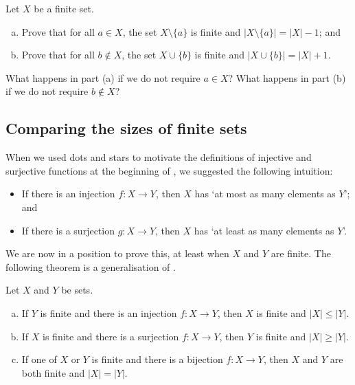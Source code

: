 \begin{exercise}
\label{exAddRemoveElementsOfFiniteSets}
Let $X$ be a finite set.
\begin{enumerate}[(a)]
\item Prove that for all $a \in X$, the set $X \setminus \{ a \}$ is finite and $|X \setminus \{ a \}| = |X|-1$; and
\item Prove that for all $b \not\in X$, the set $X \cup \{ b \}$ is finite and $|X \cup \{ b \}| = |X|+1$.
\end{enumerate}
What happens in part (a) if we do not require $a \in X$? What happens in part (b) if we do not require $b \not\in X$?
\end{exercise}

\subsection*{Comparing the sizes of finite sets}

When we used dots and stars to motivate the definitions of injective and surjective functions at the beginning of , we suggested the following intuition:
\begin{itemize} 
\item If there is an injection $f : X \to Y$, then $X$ has `at most as many elements as $Y$'; and
\item If there is a surjection $g : X \to Y$, then $X$ has `at least as many elements as $Y$'.
\end{itemize}

We are now in a position to prove this, at least when $X$ and $Y$ are finite. The following theorem is a generalisation of .

\begin{theorem}
\label{thmFiniteSetsAndJections}
Let $X$ and $Y$ be sets.
\begin{enumerate}[(a)]
\item\label{itmFiniteSetFromInjection} If $Y$ is finite and there is an injection $f : X \to Y$, then $X$ is finite and $|X| \le |Y|$.
\item\label{itmFiniteSetFromSurjection} If $X$ is finite and there is a surjection $f : X \to Y$, then $Y$ is finite and $|X| \ge |Y|$.
\item\label{itmFiniteSetFromBijection} If one of $X$ or $Y$ is finite and there is a bijection $f : X \to Y$, then $X$ and $Y$ are both finite and $|X| = |Y|$.
\end{enumerate}
\end{theorem}

